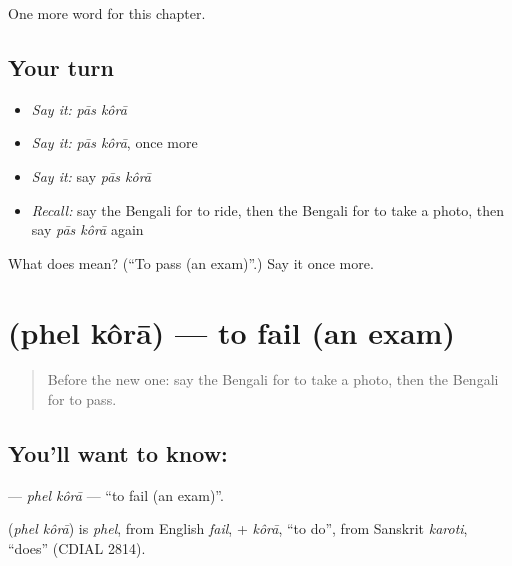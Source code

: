 \begin{grammarlens}[title={What you've built}]
One more word for this chapter.
\end{grammarlens}

\subsection*{Your turn}
\begin{itemize}
\raggedright
  \item \emph{Say it:} \emph{pās kôrā}
  \item \emph{Say it:} \emph{pās kôrā}, once more
  \item \emph{Say it:} say \emph{pās kôrā}
  \item \emph{Recall:} say the Bengali for to ride, then the Bengali for to take a photo, then say \emph{pās kôrā} again
\end{itemize}

\begin{tcolorbox}[breakable,colback=teal!4,colframe=teal!35!black,title={Before you move on}]
What does   mean? (\textquotedblleft{}To pass (an exam)\textquotedblright{}.) Say it once more.
\end{tcolorbox}
\section[\texorpdfstring{\bn{ফেল} \bn{করা} (phel kôrā)}{ফেল করা (phel kôrā)}]{  (phel kôrā) — to fail (an exam)}

\label{lesson:BN-C214-phel-kora}



\begin{quote}
Before the new one: say the Bengali for to take a photo, then the Bengali for to pass.
\end{quote}

\subsection*{You'll want to know:  }
\textbf{ } — \emph{phel kôrā} — \textquotedblleft{}to fail (an exam)\textquotedblright{}.

\begin{cousinweb}
\textbf{ } (\emph{phel kôrā}) is \emph{phel}, from English \emph{fail}, + \emph{kôrā}, \textquotedblleft{}to do\textquotedblright{}, from Sanskrit \emph{karoti}, \textquotedblleft{}does\textquotedblright{} (CDIAL 2814).
\end{cousinweb}

